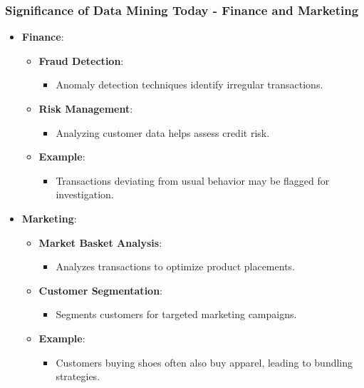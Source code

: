 \documentclass{beamer}
\begin{document}
\begin{frame}[fragile]
    \frametitle{Significance of Data Mining Today - Finance and Marketing}
    \begin{itemize}
        \item \textbf{Finance}:
        \begin{itemize}
            \item \textbf{Fraud Detection}: 
            \begin{itemize}
                \item Anomaly detection techniques identify irregular transactions.
            \end{itemize}
            \item \textbf{Risk Management}: 
            \begin{itemize}
                \item Analyzing customer data helps assess credit risk.
            \end{itemize}
            \item \textbf{Example}:
            \begin{itemize}
                \item Transactions deviating from usual behavior may be flagged for investigation.
            \end{itemize}
        \end{itemize}
        
        \item \textbf{Marketing}:
        \begin{itemize}
            \item \textbf{Market Basket Analysis}: 
            \begin{itemize}
                \item Analyzes transactions to optimize product placements.
            \end{itemize}
            \item \textbf{Customer Segmentation}: 
            \begin{itemize}
                \item Segments customers for targeted marketing campaigns.
            \end{itemize}
            \item \textbf{Example}:
            \begin{itemize}
                \item Customers buying shoes often also buy apparel, leading to bundling strategies.
            \end{itemize}
        \end{itemize}
    \end{itemize}
\end{frame}
\end{document}
